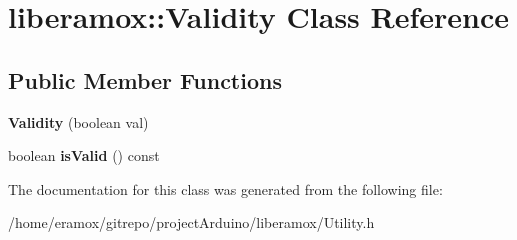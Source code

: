 \hypertarget{classliberamox_1_1Validity}{}\section{liberamox\+:\+:Validity Class Reference}
\label{classliberamox_1_1Validity}
\subsection*{Public Member Functions}
\begin{DoxyCompactItemize}
\item 
{\bfseries Validity} (boolean val)\hypertarget{classliberamox_1_1Validity_a43adbc17958ae0420dc28609aae57a5a}{}\label{classliberamox_1_1Validity_a43adbc17958ae0420dc28609aae57a5a}

\item 
boolean {\bfseries is\+Valid} () const \hypertarget{classliberamox_1_1Validity_a1221e8832050930cc291da6261d7833a}{}\label{classliberamox_1_1Validity_a1221e8832050930cc291da6261d7833a}

\end{DoxyCompactItemize}


The documentation for this class was generated from the following file\+:\begin{DoxyCompactItemize}
\item 
/home/eramox/gitrepo/project\+Arduino/liberamox/Utility.\+h\end{DoxyCompactItemize}
